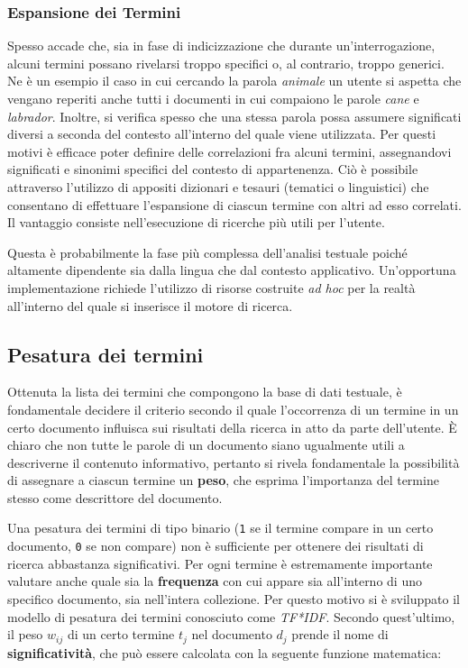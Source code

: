 \subsubsection{Espansione dei Termini}

Spesso accade che, sia in fase di indicizzazione che durante un’interrogazione, alcuni termini possano rivelarsi troppo specifici o, al contrario, troppo generici. Ne è un esempio il caso in cui cercando la parola \textit{animale} un utente si aspetta che vengano reperiti anche tutti i documenti in cui compaiono le parole \textit{cane} e \textit{labrador}. Inoltre, si verifica spesso che una stessa parola possa assumere significati diversi a seconda del contesto all’interno del quale viene utilizzata. Per questi motivi è efficace poter definire delle correlazioni fra alcuni termini, assegnandovi significati e sinonimi specifici del contesto di appartenenza. Ciò è possibile attraverso l’utilizzo di appositi dizionari e tesauri (tematici o linguistici) che consentano di effettuare l’espansione di ciascun termine con altri ad esso correlati. Il vantaggio consiste nell’esecuzione di ricerche più utili per l’utente.

Questa è probabilmente la fase più complessa dell’analisi testuale poiché altamente dipendente sia dalla lingua che dal contesto applicativo. Un’opportuna implementazione richiede l’utilizzo di risorse costruite \textit{ad hoc} per la realtà all’interno del quale si inserisce il motore di ricerca.



\subsection{Pesatura dei termini}
\label{sec:termsweight}

Ottenuta la lista dei termini che compongono la base di dati testuale, è fondamentale decidere il criterio secondo il quale l’occorrenza di un termine in un certo documento influisca sui risultati della ricerca in atto da parte dell’utente. È chiaro che non tutte le parole di un documento siano ugualmente utili a descriverne il contenuto informativo, pertanto si rivela fondamentale la possibilità di assegnare a ciascun termine un \textbf{peso}, che esprima l’importanza del termine stesso come descrittore del documento.

\vspace{1em}

Una pesatura dei termini di tipo binario (\texttt{1} se il termine compare in un certo documento, \texttt{0} se non compare) non è sufficiente per ottenere dei risultati di ricerca abbastanza significativi. Per ogni termine è estremamente importante valutare anche quale sia la \textbf{frequenza} con cui appare sia all’interno di uno specifico documento, sia nell’intera collezione. Per questo motivo si è sviluppato il modello di pesatura dei termini conosciuto come \textit{TF*IDF}. Secondo quest’ultimo, il peso \(w_{ij}\) di un certo termine \(t_{j}\) nel documento \(d_{j}\) prende il nome di \textbf{significatività}, che può essere calcolata con la seguente funzione matematica:

